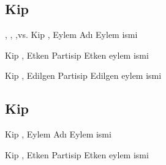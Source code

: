 

\subsection*{Kip }


\begin{kip}{, , ,vs.}
  {Kip , Eylem Adı}
  Eylem ismi
\end{kip}

\begin{kip}{}{Kip , Etken Partisip}
  Etken eylem ismi
\end{kip}

\begin{kip}{}{Kip , Edilgen Partisip}
  Edilgen eylem ismi
\end{kip}



\subsection*{Kip }

\begin{kip}{}{Kip , Eylem Adı}
  Eylem ismi
\end{kip}

\begin{kip}{}{Kip , Etken Partisip}
  Etken eylem ismi
\end{kip}

